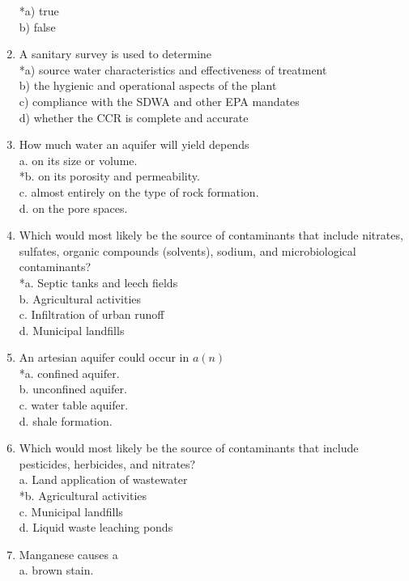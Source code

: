 \begin{enumerate}
*a) true\\
b) false\\
\item A sanitary survey is used to determine\\
*a) source water characteristics and effectiveness of treatment\\
b) the hygienic and operational aspects of the plant\\
c) compliance with the SDWA and other EPA mandates\\
d) whether the CCR is complete and accurate\\
\item How much water an aquifer will yield depends\\
a. on its size or volume.\\
*b. on its porosity and permeability.\\
c. almost entirely on the type of rock formation.\\
d. on the pore spaces.\\
\item Which would most likely be the source of contaminants that include nitrates, sulfates, organic compounds (solvents), sodium, and microbiological contaminants?\\
*a. Septic tanks and leech fields\\
b. Agricultural activities\\
c. Infiltration of urban runoff\\
d. Municipal landfills\\
\item An artesian aquifer could occur in $a(n)$\\
*a. confined aquifer.\\
b. unconfined aquifer.\\
c. water table aquifer.\\
d. shale formation.\\
\item Which would most likely be the source of contaminants that include pesticides, herbicides, and nitrates?\\
a. Land application of wastewater\\
*b. Agricultural activities\\
c. Municipal landfills\\
d. Liquid waste leaching ponds\\
\item Manganese causes a\\
a. brown stain.\\

\end{enumerate}
